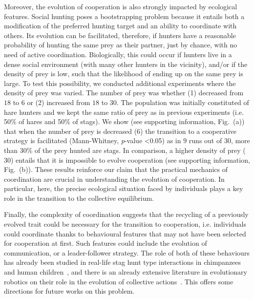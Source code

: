     Moreover, the evolution of cooperation is also strongly impacted by ecological features. Social hunting poses a bootstrapping problem because it entails both a modification of the preferred hunting target and an ability to coordinate with others. Its evolution can be facilitated, therefore, if hunters have a reasonable probability of hunting the same prey as their partner, just by chance, with no need of active coordination. Biologically, this could occur if hunters live in a dense social environment (with many other hunters in the vicinity), and/or if the density of prey is low, such that the likelihood of ending up on the same prey is large. To test this possibility, we conducted additional experiments where the density of prey was varied. The number of prey was whether (1) decreased from $18$ to $6$ or (2) increased from $18$ to $30$. The population was initially constituted of hare hunters and we kept the same ratio of prey as in previous experiments (i.e. 50\% of hares and 50\% of stags). We show (see supporting information, Fig.~(a)) that when the number of prey is decreased ($6$) the transition to a cooperative strategy is facilitated (Mann-Whitney, {\em p}-value \textless 0.05) as in $9$ runs out of $30$, more than $30$\% of the prey hunted are stags. In comparison, a higher density of prey ($30$) entails that it is impossible to evolve cooperation (see supporting information, Fig.~(b)). These results reinforce our claim that the practical mechanics of coordination are crucial in understanding the evolution of cooperation. In particular, here, the precise ecological situation faced by individuals plays a key role in the transition to the collective equilibrium.

    Finally, the complexity of coordination suggests that the recycling of a previously evolved trait could be necessary for the transition to cooperation, i.e. individuals could coordinate thanks to behavioural features that may not have been selected for cooperation at first. Such features could include the evolution of communication, or a leader-follower strategy. The role of both of these behaviours has already been studied in real-life stag hunt type interactions in chimpanzees and human children~\cite{Bullinger2011, Duguid2014}, and there is an already extensive literature in evolutionary robotics on their role in the evolution of collective actions~\cite{Trianni2007, Mitri2009, Solomon2012, Ferrante2015}. This offers some directions for future works on this problem.



